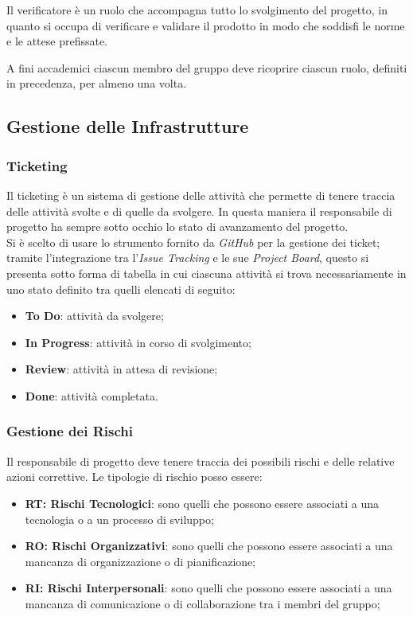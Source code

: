         Il verificatore è un ruolo che accompagna tutto lo svolgimento del progetto, in quanto si occupa di verificare e validare il prodotto in modo che soddisfi le norme e le attese prefissate.
        \bigskip
        \begin{flushleft}
        A fini accademici ciascun membro del gruppo deve ricoprire ciascun ruolo, definiti in precedenza, per almeno una volta.
        \end{flushleft}


    \subsection{Gestione delle Infrastrutture}
        \subsubsection{Ticketing} 
        Il ticketing è un sistema di gestione delle attività che permette di tenere traccia delle attività svolte e di quelle da svolgere. In questa maniera il responsabile di progetto ha sempre sotto occhio lo stato di avanzamento del progetto. \\
        Si è scelto di usare lo strumento fornito da \textit{GitHub} per la gestione dei ticket; tramite l'integrazione tra l'\textit{Issue Tracking} e le sue \textit{Project Board}, questo si presenta sotto forma di tabella in cui ciascuna attività si trova necessariamente in uno stato definito tra quelli elencati di seguito:
        \begin{itemize}
            \item \textbf{To Do}: attività da svolgere;
            \item \textbf{In Progress}: attività in corso di svolgimento;
            \item \textbf{Review}: attività in attesa di revisione;
            \item \textbf{Done}: attività completata.
        \end{itemize}

        \subsubsection{Gestione dei Rischi} 
        Il responsabile di progetto deve tenere traccia dei possibili rischi e delle relative azioni correttive.
        Le tipologie di rischio posso essere:
        \begin{itemize}
            \item \textbf{RT: Rischi Tecnologici}: sono quelli che possono essere associati a una tecnologia o a un processo di sviluppo;
            \item \textbf{RO: Rischi Organizzativi}: sono quelli che possono essere associati a una mancanza di organizzazione o di pianificazione;
            \item \textbf{RI: Rischi Interpersonali}: sono quelli che possono essere associati a una mancanza di comunicazione o di collaborazione tra i membri del gruppo;
        \end{itemize}
